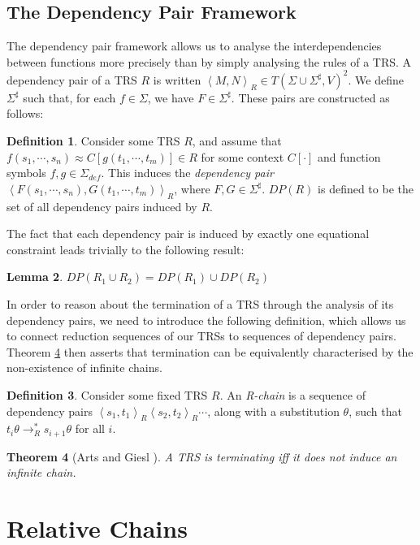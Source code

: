 \documentclass{article}
\newtheorem{theorem}{Theorem}%
\newtheorem{lemma}[theorem]{Lemma}
\theoremstyle{definition}
\newtheorem{definition}[theorem]{Definition}
\newcommand{\dpair}[2]{\left\langle #1, #2 \right\rangle}
\begin{document}
\subsection{The Dependency Pair Framework}

The dependency pair framework \cite{arts2000dependency} allows us to analyse the interdependencies between functions more precisely than by simply analysing the rules of a TRS. A dependency pair of a TRS $R$ is written $\dpair{M}{N}_R \in T(\Sigma \cup \Sigma^\sharp, V)^2$. We define $\Sigma^\sharp$ such that, for each $f \in \Sigma$, we have $F \in \Sigma^\sharp$. These pairs are constructed as follows:
\begin{definition}
    Consider some TRS $R$, and assume that $f(s_1, \cdots, s_n) \approx C[g(t_1, \cdots, t_m)] \in R$ for some context $C[\cdot]$ and function symbols $f, g \in \Sigma_{def}$. This induces the \emph{dependency pair} $\dpair{F (s_1, \cdots, s_n)}{G(t_1, \cdots, t_m)}_R $, where $F, G \in \Sigma^\sharp$. $DP(R)$ is defined to be the set of all dependency pairs induced by $R$.
\end{definition}
The fact that each dependency pair is induced by exactly one equational constraint leads trivially to the following result:
\begin{lemma} \label{thm:dep_pair_mod}
    $DP(R_1 \cup R_2) = DP(R_1) \cup DP(R_2)$
\end{lemma}
In order to reason about the termination of a TRS through the analysis of its dependency pairs, we need to introduce the following definition, which allows us to connect reduction sequences of our TRSs to sequences of dependency pairs. Theorem \ref{thm:no_infinite_chains} then asserts that termination can be equivalently characterised by the non-existence of infinite chains.
\begin{definition}
    Consider some fixed TRS $R$. An \emph{R-chain} is a sequence of dependency pairs $\dpair{s_1}{t_1}_R \dpair{s_2}{t_2}_R \cdots$, along with a substitution $\theta$, such that $t_i \theta \rightarrow_R^* s_{i+1}\theta$ for all $i$.
\end{definition}
\begin{theorem}[Arts and Giesl \cite{arts2000dependency}]\label{thm:no_infinite_chains}
    A TRS is terminating iff it does not induce an infinite chain.
\end{theorem} 

\section{Relative Chains}
\end{document}
